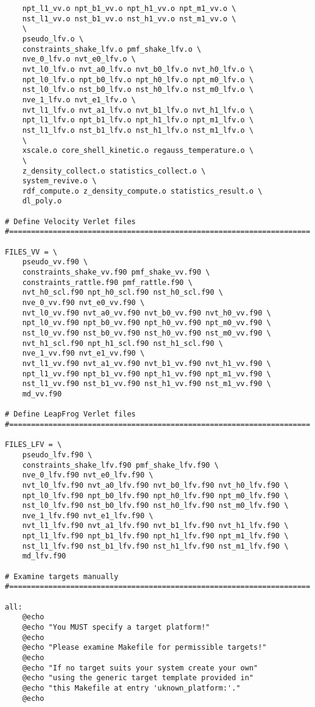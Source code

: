 \begin{verbatim}
	npt_l1_vv.o npt_b1_vv.o npt_h1_vv.o npt_m1_vv.o \
	nst_l1_vv.o nst_b1_vv.o nst_h1_vv.o nst_m1_vv.o \
	\
	pseudo_lfv.o \
	constraints_shake_lfv.o pmf_shake_lfv.o \
	nve_0_lfv.o nvt_e0_lfv.o \
	nvt_l0_lfv.o nvt_a0_lfv.o nvt_b0_lfv.o nvt_h0_lfv.o \
	npt_l0_lfv.o npt_b0_lfv.o npt_h0_lfv.o npt_m0_lfv.o \
	nst_l0_lfv.o nst_b0_lfv.o nst_h0_lfv.o nst_m0_lfv.o \
	nve_1_lfv.o nvt_e1_lfv.o \
	nvt_l1_lfv.o nvt_a1_lfv.o nvt_b1_lfv.o nvt_h1_lfv.o \
	npt_l1_lfv.o npt_b1_lfv.o npt_h1_lfv.o npt_m1_lfv.o \
	nst_l1_lfv.o nst_b1_lfv.o nst_h1_lfv.o nst_m1_lfv.o \
	\
	xscale.o core_shell_kinetic.o regauss_temperature.o \
	\
	z_density_collect.o statistics_collect.o \
	system_revive.o \
	rdf_compute.o z_density_compute.o statistics_result.o \
	dl_poly.o

# Define Velocity Verlet files
#=====================================================================

FILES_VV = \
	pseudo_vv.f90 \
	constraints_shake_vv.f90 pmf_shake_vv.f90 \
	constraints_rattle.f90 pmf_rattle.f90 \
	nvt_h0_scl.f90 npt_h0_scl.f90 nst_h0_scl.f90 \
	nve_0_vv.f90 nvt_e0_vv.f90 \
	nvt_l0_vv.f90 nvt_a0_vv.f90 nvt_b0_vv.f90 nvt_h0_vv.f90 \
	npt_l0_vv.f90 npt_b0_vv.f90 npt_h0_vv.f90 npt_m0_vv.f90 \
	nst_l0_vv.f90 nst_b0_vv.f90 nst_h0_vv.f90 nst_m0_vv.f90 \
	nvt_h1_scl.f90 npt_h1_scl.f90 nst_h1_scl.f90 \
	nve_1_vv.f90 nvt_e1_vv.f90 \
	nvt_l1_vv.f90 nvt_a1_vv.f90 nvt_b1_vv.f90 nvt_h1_vv.f90 \
	npt_l1_vv.f90 npt_b1_vv.f90 npt_h1_vv.f90 npt_m1_vv.f90 \
	nst_l1_vv.f90 nst_b1_vv.f90 nst_h1_vv.f90 nst_m1_vv.f90 \
	md_vv.f90

# Define LeapFrog Verlet files
#=====================================================================

FILES_LFV = \
	pseudo_lfv.f90 \
	constraints_shake_lfv.f90 pmf_shake_lfv.f90 \
	nve_0_lfv.f90 nvt_e0_lfv.f90 \
	nvt_l0_lfv.f90 nvt_a0_lfv.f90 nvt_b0_lfv.f90 nvt_h0_lfv.f90 \
	npt_l0_lfv.f90 npt_b0_lfv.f90 npt_h0_lfv.f90 npt_m0_lfv.f90 \
	nst_l0_lfv.f90 nst_b0_lfv.f90 nst_h0_lfv.f90 nst_m0_lfv.f90 \
	nve_1_lfv.f90 nvt_e1_lfv.f90 \
	nvt_l1_lfv.f90 nvt_a1_lfv.f90 nvt_b1_lfv.f90 nvt_h1_lfv.f90 \
	npt_l1_lfv.f90 npt_b1_lfv.f90 npt_h1_lfv.f90 npt_m1_lfv.f90 \
	nst_l1_lfv.f90 nst_b1_lfv.f90 nst_h1_lfv.f90 nst_m1_lfv.f90 \
	md_lfv.f90

# Examine targets manually
#=====================================================================

all:
	@echo
	@echo "You MUST specify a target platform!"
	@echo
	@echo "Please examine Makefile for permissible targets!"
	@echo
	@echo "If no target suits your system create your own"
	@echo "using the generic target template provided in"
	@echo "this Makefile at entry 'uknown_platform:'."
	@echo


\end{verbatim}
